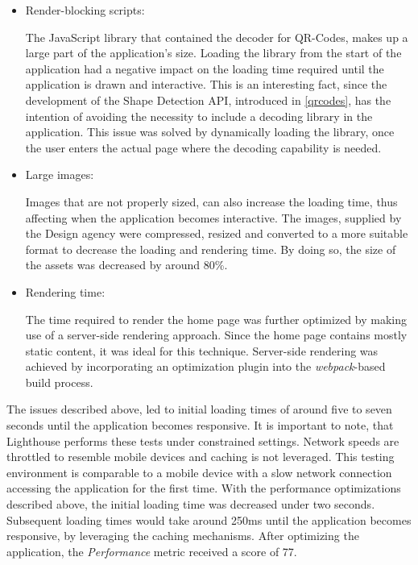 \begin{itemize}
\item Render-blocking scripts:

The JavaScript library that contained the decoder for QR-Codes, makes up a large part of the application's size. Loading the library from the start of the application had a negative impact on the loading time required until the application is drawn and interactive. This is an interesting fact, since the development of the Shape Detection API, introduced in \ref{qrcodes}, has the intention of avoiding the necessity to include a decoding library in the application. This issue was solved by dynamically loading the library, once the user enters the actual page where the decoding capability is needed.
\item Large images:

Images that are not properly sized, can also increase the loading time, thus affecting when the application becomes interactive. The images, supplied by the Design agency were compressed, resized and converted to a more suitable format to decrease the loading and rendering time. By doing so, the size of the assets was decreased by around 80\%.

\item Rendering time:

The time required to render the home page was further optimized by making use of a server-side rendering approach. Since the home page contains mostly static content, it was ideal for this technique. Server-side rendering was achieved by incorporating an optimization plugin into the \textit{webpack}-based build process.
\end{itemize}
The issues described above, led to initial loading times of around five to seven seconds until the application becomes responsive. It is important to note, that Lighthouse performs these tests under constrained settings. Network speeds are throttled to resemble mobile devices and caching is not leveraged. This testing environment is comparable to a mobile device with a slow network connection accessing the application for the first time. With the performance optimizations described above, the initial loading time was decreased under two seconds. Subsequent loading times would take around 250ms until the application becomes responsive, by leveraging the caching mechanisms.
After optimizing the application, the \textit{Performance} metric received a score of 77.

